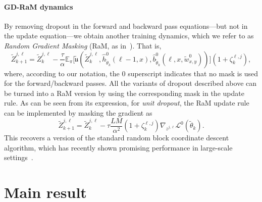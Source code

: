 \documentclass[a4paper,11pt]{article}
\newcommand{\1}{\mathbbm{1}}
\newcommand{\E}{\mathbb{E}}
\renewcommand{\L}{\mathcal{L}}
\theoremstyle{definition}
\theoremstyle{remark}
\begin{document}
\paragraph{GD-RaM dynamics} By removing dropout in the forward and backward pass equations---but not in the update equation---we obtain another training dynamics, which we refer to as \emph{Random Gradient Masking} (RaM, as in~\cite{chizat2025phasediagramdropouttwolayer}). That is, 
\begin{equation}\label{eq:parameter_update_resnet_ram}
  \tilde{Z}_{k+1}^{j,\ell} = \tilde{Z}_{k}^{j,\ell} - \frac{\tau}{\alpha}\E_{\pi}\big[\tilde{\mathfrak{u}}(\tilde{Z}_{k}^{j,\ell}, \hat{h}_{\tilde{\theta}_k}^{0}(\ell-1, x), \hat{b}_{\tilde{\theta}_k}^{0}(\ell, x, \tilde{w}^{0}_{x,y}))\big](1+ \zeta^{\ell, j}_k),
\end{equation}
where, according to our notation, the $0$ superscript indicates that no mask is used for the forward/backward passes. All the variants of dropout described above can be turned into a RaM version by using the corresponding mask in the update rule.
%
As can be seen from its expression, for \emph{unit dropout}, the RaM update rule can be implemented by masking the gradient as~
\begin{equation}\label{eq:parameter_update_resnet_ram_implementable}
  \tilde{Z}_{k+1}^{j,\ell} = \tilde{Z}_{k}^{j,\ell} - \tau \frac{L M}{\alpha^2}(1+ \zeta^{\ell, j}_k)\nabla_{z^{j,\ell}} \L^{0}(\tilde{\theta}_k).
\end{equation}
This recovers a version of the standard random block coordinate descent algorithm, which has recently shown promising performance in large-scale settings~\cite{joo2026surprisingeffectivenessmaskingupdates}.


\section{Main result}\label{sec:main-result}
\end{document}
